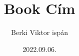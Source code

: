 \documentclass{book}
\begin{document}
\title{ Book Cím}
\author{Berki Viktor ispán}
\date{2022.09.06.}
\maketitle
\hulipsum[1-3]
\end{document}
